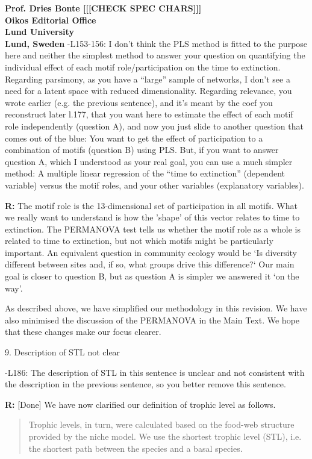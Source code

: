 \documentclass[12pt]{letter}
\begin{document}
\begin{letter}{\bf Prof. Dries Bonte [[[CHECK SPEC CHARS]]]\\
Oikos Editorial Office \\
Lund University \\
Lund, Sweden}
        -L153-156:  I don’t think the PLS method is fitted to the purpose here and neither the simplest method to answer your question on quantifying the individual effect of each motif role/participation on the time to extinction. Regarding parsimony, as you have a ``large'' sample of networks, I don’t see a need for a latent space with reduced dimensionality. Regarding relevance, you wrote earlier (e.g. the previous sentence), and it’s meant by the coef you reconstruct later l.177, that you want here to estimate the effect of each motif role independently (question A), and now you just slide to another question that comes out of the blue: You want to get the effect of participation to a combination of motifs (question B) using PLS. But, if you want to answer question A, which I understood as your real goal, you can use a much simpler method: A multiple linear regression of the ``time to extinction'' (dependent variable) versus the motif roles, and your other variables (explanatory variables).
        
        \textbf{R:}
        The motif role is the 13-dimensional set of participation in all motifs. What we really want to understand is how the 'shape' of this vector relates to time to extinction. 
        The PERMANOVA test tells us whether the motif role as a whole is related to time to extinction, but not which motifs might be particularly important. 
        An equivalent question in community ecology would be `Is diversity different between sites and, if so, what groups drive this difference?` 
        Our main goal is closer to question B, but as question A is simpler we answered it `on the way'.


        As described above, we have simplified our methodology in this revision.
        We have also minimised the discussion of the PERMANOVA in the Main Text.
        We hope that these changes make our focus clearer.
    

    9. Description of STL not clear

      -L186: The description of STL in this sentence is unclear and not consistent with the description in the previous sentence, so you better remove this sentence.

      \textbf{R:} [Done]
      We have now clarified our definition of trophic level as follows.
      
      \begin{quotation}
        Trophic levels, in turn, were calculated based on the food-web structure provided by the niche model. We use the shortest trophic level (STL), i.e. the shortest path between the species and a basal species.
      \end{quotation}
      

\end{letter}
\end{document}
